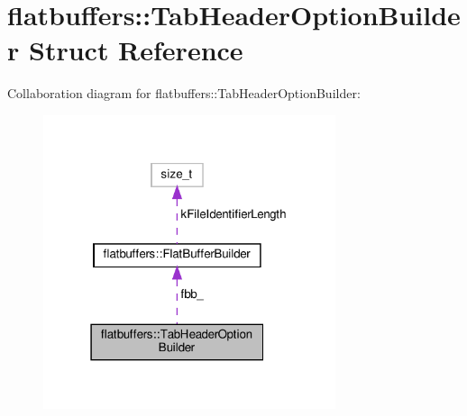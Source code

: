 \hypertarget{structflatbuffers_1_1TabHeaderOptionBuilder}{}\section{flatbuffers\+:\+:Tab\+Header\+Option\+Builder Struct Reference}
\label{structflatbuffers_1_1TabHeaderOptionBuilder}


Collaboration diagram for flatbuffers\+:\+:Tab\+Header\+Option\+Builder\+:
\nopagebreak
\begin{figure}[H]
\begin{center}
\leavevmode
\includegraphics[width=243pt]{structflatbuffers_1_1TabHeaderOptionBuilder__coll__graph}
\end{center}
\end{figure}
